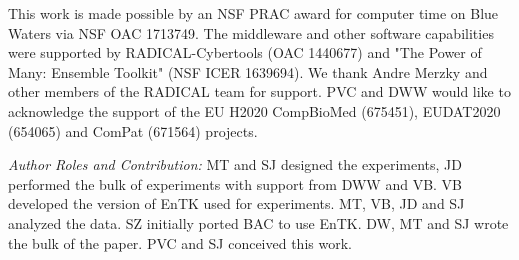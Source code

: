 \footnotesize

This work is made possible by an NSF PRAC award for computer time on Blue Waters via
NSF OAC	1713749. The middleware and other software capabilities were supported by RADICAL-Cybertools (OAC 1440677) and "The Power of Many: Ensemble Toolkit" (NSF ICER 1639694). We thank Andre Merzky and other members of the RADICAL team for support. PVC and DWW would like to acknowledge the support of the EU H2020 CompBioMed (675451), EUDAT2020 (654065) and ComPat (671564) projects.

{\it Author Roles and Contribution:} MT and SJ designed the experiments, JD
performed the bulk of experiments with support from DWW and VB. VB developed
the version of EnTK used for experiments. MT, VB, JD and SJ analyzed the data.
SZ initially ported BAC to use EnTK. DW, MT and SJ wrote the bulk of the
paper. PVC and SJ conceived this work.










